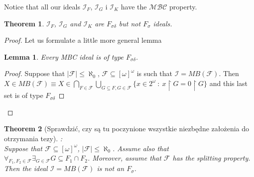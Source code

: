 \documentclass{amsart}
\newtheorem{thm}{Theorem}
\newtheorem{lem}{Lemma}
\theoremstyle{definition}
\theoremstyle{definition}
\newcommand{\N}{{\mathbb N}}
\newcommand{\I}{\mathcal I}
\begin{document}
Notice that all our ideals $\I_F$, $\I_G$ i $\I_K$ have the $\mathcal{MBC}$ property.

%
%
%
%
%
%
%

\begin{thm}
$\I_F$, $\I_G$ and $\I_K$ are $F_{\sigma\delta}$ but not $F_{\sigma}$ ideals.
\end{thm}

\begin{proof}
Let us formulate a little more general lemma
\begin{lem}
Every \emph{MBC} ideal is of type $F_{\sigma\delta}$.
\end{lem}
\begin{proof}
Suppose that $|\mathcal{F}|\leq\aleph_0$, $\mathcal{F}\subseteq [\omega]^\omega$ is such that $\I = MB(\mathcal{F})$.
Then $X\in MB(\mathcal{F}) \equiv X\in \bigcap_{F\in\mathcal{F}} \bigcup_{G\subseteq F, G\in\mathcal{F}} \{x\in 2^\omega\ :\ x\upharpoonright G = 0\upharpoonright G\}$ 
and this last set is of type $F_{\sigma\delta}$
\end{proof}
\end{proof}

\begin{thm}
[Sprawdzić, czy są tu poczynione wszystkie niezbędne założenia do otrzymania tezy]:\\
Suppose that $\mathcal{F}\subseteq [\omega]^\omega$,
$|\mathcal{F}|\leq\aleph_0$. 
Assume also that
$\forall_{F_1, F_2 \in \mathcal{F}} \exists_{G \in \mathcal{F}} G \subseteq F_1 \cap F_2$.
Moreover, assume that $\mathcal{F}$ has the splitting property. 
Then the ideal $\I =  MB(\mathcal{F})$ 
is not an $F_{\sigma}$.
\end{thm}
\end{document}
